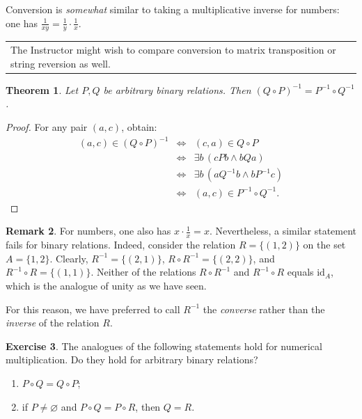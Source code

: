 \documentclass[12pt,notitlepage]{article}
\theoremstyle{plain}
\newtheorem{thm}{Theorem}[section]
\theoremstyle{definition}
\newtheorem{exc}[thm]{Exercise}
\newtheorem{rem}[thm]{Remark}
\theoremstyle{plain}
\newcommand{\void}{\varnothing}
\newcommand{\id}{\mathrm{id}}
\newcommand{\1}{\mathbf{1}}
\newcommand{\0}{\mathbf{0}}
\newcommand{\mcomm}[1]{
\medskip\noindent\begin{tabular}{| l}
\parbox{0.99\textwidth}{{\small
#1 }}\end{tabular}
\smallskip}
\begin{document}
\noindent Conversion is \emph{somewhat} similar to taking a multiplicative inverse for numbers: one has $\frac{1}{xy} = \frac{1}{y} \cdot \frac{1}{x}$.

\mcomm{The Instructor might wish to compare conversion to matrix transposition or string reversion as well.}
\begin{thm}\label{ch0:comp_inv}
Let $P, Q$ be arbitrary binary relations. Then $(Q \circ P)^{-1} = P^{-1} \circ Q^{-1}$.
\end{thm}
\begin{proof}
For any pair $(a,c)$, obtain:
$$
\begin{array}{rcl}
(a, c) \in (Q \circ P)^{-1} &\iff& (c, a) \in Q \circ P\\
&\iff&\exists b\, (cPb \wedge bQa)\\
&\iff&\exists b\, (a Q^{-1} b \wedge b P^{-1} c)\\
&\iff&(a, c) \in P^{-1} \circ Q^{-1}.
\end{array}
$$
\end{proof}
\begin{rem}
For numbers, one also has $x \cdot \frac{1}{x} = x$. Nevertheless, a similar statement fails for binary relations. Indeed, consider the relation $R = \{ (1, 2) \}$ on the set $A = \{1, 2\}$. Clearly, $R^{-1} = \{ (2,1) \}$, $R \circ R^{-1} = \{ (2,2)\}$, and $R^{-1} \circ R = \{ (1, 1)\}$. Neither of the relations $R \circ R^{-1}$ and $R^{-1} \circ R$ equals $\id_A$, which is the analogue of unity as we have seen.

For this reason, we have preferred to call $R^{-1}$ the \emph{converse} rather than the \emph{inverse} of the relation $R$.
\end{rem}
\begin{exc}
The analogues of the following statements hold for numerical multiplication. Do they hold for arbitrary binary relations?
\begin{enumerate}
\item $P \circ Q = Q \circ P$;
\item if $P \neq \void$ and $P \circ Q = P \circ R$, then $Q = R$.
\end{enumerate}
\end{exc}
\end{document}
